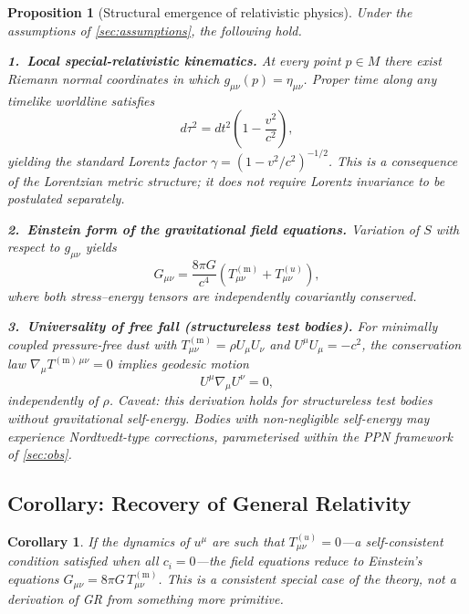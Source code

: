 \documentclass[12pt,a4paper]{article}
\newtheorem{proposition}{Proposition}
\newtheorem{corollary}{Corollary}[proposition]
\newcommand{\Tmm}{T^{(\mathrm{m})}_{\mu\nu}}
\newcommand{\Tuu}{T^{(u)}_{\mu\nu}}
\begin{document}
\begin{proposition}[Structural emergence of relativistic physics]
\label{prop:main}
Under the assumptions of \cref{sec:assumptions}, the following hold.

\smallskip\noindent
\textbf{1.\ Local special-relativistic kinematics.}
At every point $p\in M$ there exist Riemann normal coordinates in which
$g_{\mu\nu}(p)=\eta_{\mu\nu}$. Proper time along any timelike worldline
satisfies
\begin{equation}
  d\tau^{2}=dt^{2}\!\left(1-\frac{v^{2}}{c^{2}}\right),
\end{equation}
yielding the standard Lorentz factor $\gamma=(1-v^{2}/c^{2})^{-1/2}$. This
is a consequence of the Lorentzian metric structure; it does not require
Lorentz invariance to be postulated separately.

\smallskip\noindent
\textbf{2.\ Einstein form of the gravitational field equations.}
Variation of $S$ with respect to $g_{\mu\nu}$ yields
\begin{equation}
  G_{\mu\nu}=\frac{8\pi G}{c^{4}}\!\left(\Tmm+\Tuu\right),
  \label{eq:field_eqs}
\end{equation}
where both stress--energy tensors are independently covariantly conserved.

\smallskip\noindent
\textbf{3.\ Universality of free fall (structureless test bodies).}
For minimally coupled pressure-free dust with
$\Tmm=\rho U_{\mu}U_{\nu}$ and $U^{\mu}U_{\mu}=-c^{2}$,
the conservation law $\nabla_{\!\mu}T^{(\mathrm{m})\,\mu\nu}=0$ implies
geodesic motion
\begin{equation}
  U^{\mu}\nabla_{\!\mu}U^{\nu}=0,
\end{equation}
independently of $\rho$. \emph{Caveat:} this derivation holds for
structureless test bodies without gravitational self-energy. Bodies with
non-negligible self-energy may experience Nordtvedt-type corrections,
parameterised within the PPN framework of \cref{sec:obs}.
\end{proposition}

\subsection{Corollary: Recovery of General Relativity}


\begin{corollary}
If the dynamics of $u^{\mu}$ are such that $\Tuu=0$---a self-consistent
condition satisfied when all $c_{i}=0$---the field equations reduce to
Einstein's equations $G_{\mu\nu}=8\pi G\,\Tmm$. This is a consistent
special case of the theory, not a derivation of GR from something more
primitive.
\end{corollary}
\end{document}
